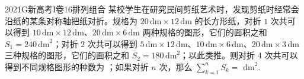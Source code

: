 
\begin{problem}{2021}{G}{新高考I卷}{16}{排列组合}
某校学生在研究民间剪纸艺术时，发现剪纸时经常会沿纸的某条对称轴把纸对折。规格为 $ 20\,\mathrm{dm}\times 12\,\mathrm{dm} $ 的长方形纸，对折 $ 1 $ 次共可以得到 $ 10\,\mathrm{dm}\times 12\,\mathrm{dm} $、$ 20\,\mathrm{dm}\times 6\,\mathrm{dm} $ 两种规格的图形，它们的面积之和 $ S_1=240\,\mathrm{dm}^2 $；对折 $ 2 $ 次共可以得到 $ 5\,\mathrm{dm}\times 12\,\mathrm{dm} $、$ 10\,\mathrm{dm}\times 6\,\mathrm{dm} $、$ 20\,\mathrm{dm}\times 3\,\mathrm{dm} $ 三种规格的图形，它们的面积之和 $ S_2=180\,\mathrm{dm}^2 $；以此类推。则对折 $ 4 $ 次共可以得到不同规格图形的种数为 \underline{\hspace{4em}}；如果对折 $ n $ 次，那么 $ \displaystyle\sum_{k=1}^{n}S_k= $ \underline{\hspace{4em}}$ \mathrm{dm}^2 $.
\end{problem}

\begin{answer}

\end{answer}

\begin{solutions}

\end{solutions}